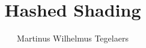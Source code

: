 \documentclass[sigconf]{acmart}
\title{Hashed Shading}
\author{Martinus Wilhelmus Tegelaers}
\affiliation{\institution{KULeuven}}
\begin{document}



\maketitle


  








\appendix
\onecolumn

\end{document}

